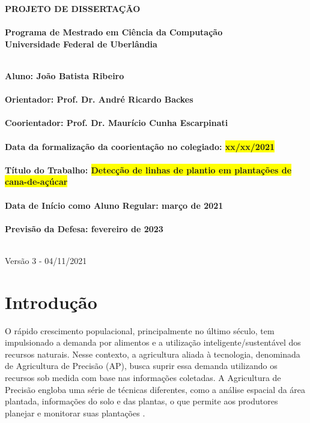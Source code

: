 \documentclass[12pt, a4paper, english, brazil]{article}
\newcommand{\textRed}[1]{{{\color{red} #1}}}
\begin{document}
\rhead{\thepage}

\begin{center}
	\bf{\LARGE{PROJETO DE DISSERTAÇÃO}\\ $\ $\\}
	\Large{Programa de Mestrado em Ciência da Computação\\
		Universidade Federal de Uberlândia}\\ $\ $\\
\end{center}

\begin{center}
	\bf{Aluno: João Batista Ribeiro\\ $\ $\\
		Orientador: Prof. Dr. André Ricardo Backes\\ $\ $\\
		Coorientador: Prof. Dr. Maurício Cunha Escarpinati\\ $\ $\\
		Data da formalização da coorientação no colegiado: \colorbox{yellow}{xx/xx/2021}\\ $\ $\\
		Título do Trabalho: \colorbox{yellow}{Detecção de linhas de plantio em plantações de cana-de-açúcar}\\ $\ $\\
		Data de Início como Aluno Regular: março de 2021\\ $\ $\\
		Previsão da Defesa: fevereiro de 2023\\ $\ $\\}
\end{center}

\textRed{Versão 3 - 04/11/2021}

\section{Introdução}

O rápido crescimento populacional, principalmente no último século, tem impulsionado a demanda por alimentos e a utilização inteligente/sustentável dos recursos naturais. Nesse contexto, a agricultura aliada à tecnologia, denominada de Agricultura de Precisão (AP), busca suprir essa demanda utilizando os recursos sob medida com base nas informações coletadas. A Agricultura de Precisão engloba uma série de técnicas diferentes, como a análise espacial da área plantada, informações do solo e das plantas, o que permite aos produtores planejar e monitorar suas plantações \cite{Blasch_2020}.
\end{document}
